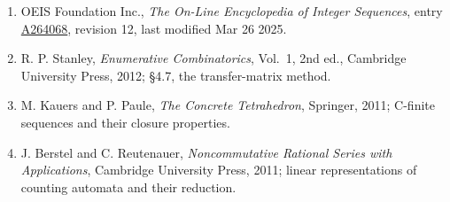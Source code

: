 \documentclass[11pt]{article}
\theoremstyle{definition}
\begin{document}
\begin{enumerate}

\item OEIS Foundation Inc., \emph{The On-Line Encyclopedia of Integer Sequences}, entry \href{https://oeis.org/A264068}{A264068}, revision 12, last modified Mar 26 2025.

\item R. P. Stanley, \emph{Enumerative Combinatorics}, Vol.~1, 2nd ed., Cambridge University Press, 2012; \S4.7, the transfer-matrix method.

\item M. Kauers and P. Paule, \emph{The Concrete Tetrahedron}, Springer, 2011; C-finite sequences and their closure properties.

\item J. Berstel and C. Reutenauer, \emph{Noncommutative Rational Series with Applications}, Cambridge University Press, 2011; linear representations of counting automata and their reduction.

\end{enumerate}
\end{document}
